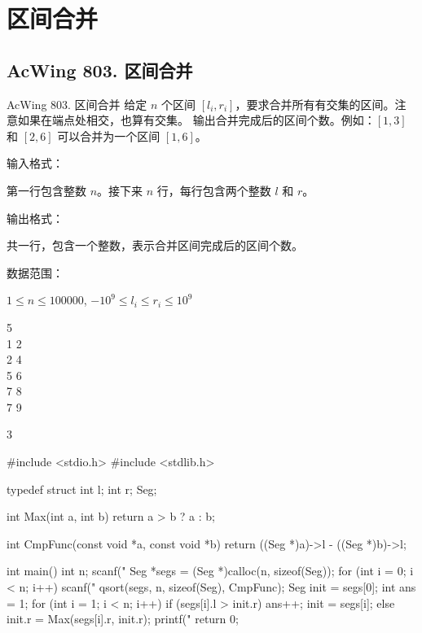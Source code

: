 \section{区间合并}

\subsection{AcWing 803. 区间合并}
\begin{titledbox}{AcWing 803. 区间合并}
    给定 $n$ 个区间 $[l_i, r_i]$，要求合并所有有交集的区间。注意如果在端点处相交，也算有交集。
    输出合并完成后的区间个数。例如：$[1,3]$ 和 $[2,6]$ 可以合并为一个区间 $[1,6]$。

    输入格式：

    第一行包含整数 $n$。接下来 $n$ 行，每行包含两个整数 $l$ 和 $r$。

    输出格式：

    共一行，包含一个整数，表示合并区间完成后的区间个数。

    数据范围：

    $1 \le n \le 100000$, $-10^9 \le l_i \le r_i \le 10^9$

    \begin{inputblock}
        5 \\
        1 2 \\
        2 4 \\
        5 6 \\
        7 8 \\
        7 9
    \end{inputblock}
    \begin{outputblock}
        3
    \end{outputblock}
\end{titledbox}

\begin{mycpptwocol}[区间合并]
    #include <stdio.h>
    #include <stdlib.h>

    typedef struct {
        int l;
        int r;
    } Seg;

    int Max(int a, int b) {
        return a > b ? a : b;
    }

    int CmpFunc(const void *a, const void *b) {
        return ((Seg *)a)->l - ((Seg *)b)->l;
    }

    int main() {
        int n;
        scanf("%
        Seg *segs = (Seg *)calloc(n, sizeof(Seg));
        for (int i = 0; i < n; i++) {
            scanf("%
        }
        qsort(segs, n, sizeof(Seg), CmpFunc);
        Seg init = segs[0];
        int ans = 1;
        for (int i = 1; i < n; i++) {
            if (segs[i].l > init.r) {
                ans++;
                init = segs[i];
            } else {
                init.r = Max(segs[i].r, init.r);
            }
        }
        printf("%
        return 0;
    }
\end{mycpptwocol}